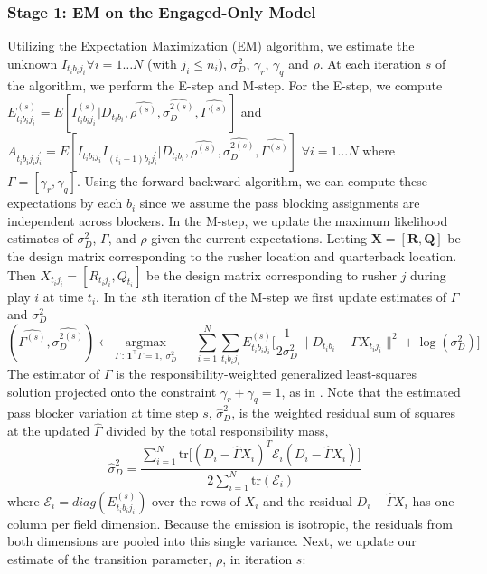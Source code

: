 \documentclass[USenglish]{article}
\theoremstyle{dgthm}
\theoremstyle{dgdef}
\begin{document}
\begin{appendices}
\subsubsection{Stage 1: EM on the Engaged-Only Model}
Utilizing the Expectation Maximization (EM) algorithm, we estimate the unknown $I_{t_ib_ij_i} \forall i = 1 \dots N$ (with $j_i \le n_i$), $\sigma^2_D$, $\gamma_r$, $\gamma_q$ and $\rho$. At each iteration $s$ of the algorithm, we perform the E-step and M-step. For the E-step, we compute $E_{t_ib_ij_i}^{(s)} = E[I^{(s)}_{t_ib_ij_i} | D_{t_ib_i}, \hat{\rho^{(s)}}, \hat{\sigma^{2(s)}_D}, \hat{\Gamma^{(s)}}] $ and $A_{t_ib_ij_ij_{i}^{'}} = E[I_{t_i b_i j_i} I_{(t_i-1) b_i j_i^{'} }| D_{t_ib_i}, \hat{\rho^{(s)}}, \hat{\sigma^{2(s)}_D}, \hat{\Gamma^{(s)}}]$ $\forall i = 1 \dots N$
where $\Gamma = [\gamma_r, \gamma_q]$.
Using the forward-backward algorithm, we can compute these expectations by each $b_i$ since we assume the pass blocking assignments are independent across blockers.
In the M-step, we update the maximum likelihood estimates of $\sigma^2_D$, $\Gamma$, and $\rho$ given the current expectations. 
Letting $\mathbf{X} = [\mathbf{R}, \mathbf{Q}]$ be the design matrix corresponding to the rusher location and quarterback location. Then $X_{t_ij_i} = [R_{t_ij_i}, Q_{t_i}]$ be the design matrix corresponding to rusher $j$ during play $i$ at time $t_i$.
In the $s$th iteration of the M-step we first update estimates of $\Gamma$ and $\sigma^2_D$
$$ (\hat{\Gamma^{(s)}}, \hat{\sigma^{2(s)}_D}) \xleftarrow{} \underset{\Gamma \,:\, \mathbf{1}^\top\Gamma = 1,\; \sigma^2_D}{\mathrm{argmax}} \; - \sum_{i=1}^{N} \sum_{t_i b_ij_i} E_{t_ib_ij_i}^{(s)}\Big[\frac{1}{2\sigma^2_D}\lVert D_{t_ib_i} - \Gamma X_{t_ij_i}\rVert^2 + \log(\sigma^2_D)\Big]$$
The estimator of $\Gamma$ is the responsibility-weighted generalized least-squares solution projected onto the constraint $\gamma_r + \gamma_q = 1$, as in \cite{franks2015characterizing}.
Note that the estimated pass blocker variation at time step $s$, $\hat{\sigma}^2_D$, is the weighted residual sum of squares at the updated $\hat{\Gamma}$ divided by the total responsibility mass,
$$ \hat{\sigma}^2_D = \frac{\sum_{i=1}^N \mathrm{tr}\big[(D_i - \hat{\Gamma}X_i)^{T}\mathcal{E}_i(D_i - \hat{\Gamma}X_i)\big]}{2\sum_{i=1}^N \mathrm{tr}(\mathcal{E}_i)} $$
where $\mathcal{E}_i = diag(E_{t_ib_ij_i}^{(s)})$ over the rows of $X_i$ and the residual $D_i - \hat{\Gamma}X_i$ has one column per field dimension. Because the emission is isotropic, the residuals from both dimensions are pooled into this single variance.
Next, we update our estimate of the transition parameter, $\rho$, in iteration $s$:

\end{appendices}
\end{document}
